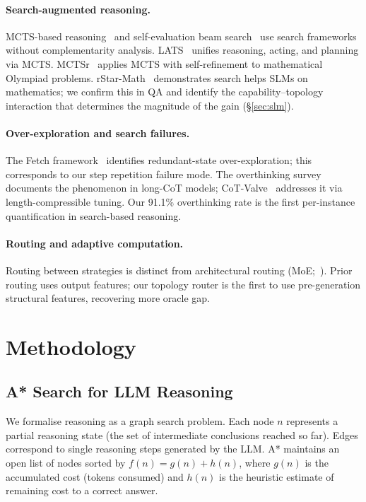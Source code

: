 \documentclass[11pt]{article}
\begin{document}
\paragraph{Search-augmented reasoning.}
MCTS-based reasoning~\citep{hao2023reasoning} and self-evaluation beam
search~\citep{xie2024self} use search frameworks without complementarity
analysis.  LATS~\citep{zhou2024language} unifies reasoning, acting, and
planning via MCTS.  MCTSr~\citep{zhang2024accessing} applies MCTS with
self-refinement to mathematical Olympiad problems.
rStar-Math~\citep{guan2025rstar} demonstrates search helps SLMs on
mathematics; we confirm this in QA and identify the capability--topology
interaction that determines the magnitude of the gain (\S\ref{sec:slm}).

\paragraph{Over-exploration and search failures.}
The Fetch framework~\citep{zhang2025streamlined} identifies redundant-state
over-exploration; this corresponds to our step repetition failure mode.
The overthinking survey~\citep{zhang2025survey} documents the
phenomenon in long-CoT models; CoT-Valve~\citep{ma2025cotvalve} addresses it
via length-compressible tuning.  Our 91.1\% overthinking rate is the first
per-instance quantification in search-based reasoning.

\paragraph{Routing and adaptive computation.}
Routing between strategies is distinct from architectural routing
(MoE;~\citealt{shazeer2017outrageously}).  Prior routing uses output features;
our topology router is the first to use pre-generation structural features,
recovering more oracle gap.

\section{Methodology}
\label{sec:method}

\subsection{A* Search for LLM Reasoning}
\label{sec:astar_method}

We formalise reasoning as a graph search problem.  Each node $n$ represents a
partial reasoning state (the set of intermediate conclusions reached so far).
Edges correspond to single reasoning steps generated by the LLM.  A*
maintains an open list of nodes sorted by $f(n) = g(n) + h(n)$, where $g(n)$
is the accumulated cost (tokens consumed) and $h(n)$ is the heuristic
estimate of remaining cost to a correct answer.
\end{document}
